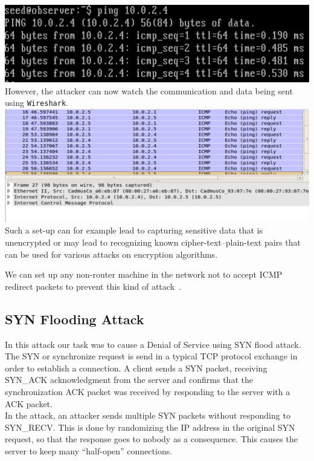 \documentclass[12pt, a4paper]{article}
\begin{document}
\includegraphics[width=.95\textwidth]{gfx/imcp-ping}\\

However, the attacker can now watch the communication and data being sent using \texttt{Wireshark}.\\

\includegraphics[width=.95\textwidth]{gfx/imcp-shark}\\

Such a set-up can for example lead to capturing sensitive data that is unencrypted or may lead to recognizing known cipher-text--plain-text pairs that can be used for various attacks on encryption algorithms.

We can set up any non-router machine in the network not to accept ICMP redirect packets to prevent this kind of attack~\cite{imcp}.

\subsection{SYN Flooding Attack}

In this attack our task was to cause a Denial of Service using SYN flood attack. The SYN or synchronize request is send in a typical TCP protocol exchange in order to establish a connection. A client sends a SYN packet, receiving SYN\_ACK acknowledgment from the server and confirms that the synchronization ACK packet was received by responding to the server with a ACK packet.\\

In the attack, an attacker sends multiple SYN packets without responding to SYN\_RECV. This is done by randomizing the IP address in the original SYN request, so that the response goes to nobody as a consequence. This causes the server to keep many ``half-open'' connections.\\
\end{document}
